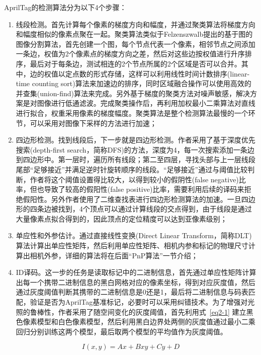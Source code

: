 AprilTag的检测算法分为以下4个步骤：

\begin{enumerate}[label=(\arabic*)] 
	\item 线段检测。首先计算每个像素的梯度方向和幅度，并通过聚类算法将梯度方向和幅度相似的像素点聚在一起。聚类算法类似于Felzenszwalb提出的基于图的图像分割算法，首先创建一个图，每个节点代表一个像素，相邻节点之间添加一条边，权值为2个像素点的梯度方向之差，然后对这些边按权值进行升序排序，最后对于每条边，测试相连的2个节点所属的2个区域是否可以合并。其中，边的权值以定点数的形式存储，这样可以利用线性时间计数排序(linear-time counting sort)算法来加速边的排序，同时区域融合操作可以使用高效的并查集(union-find)算法来完成。另外基于梯度的聚类方法对噪声敏感，解决方案是对图像进行低通滤波。完成聚类操作后，再利用加权最小二乘算法对直线进行拟合，权重采用像素的梯度幅度。聚类算法是整个检测算法最慢的一个环节，可以采用对图像下采样的方法进行加速；
	\item 四边形检测。找到线段后，下一步就是四边形检测。作者采用了基于深度优先搜索(depth-first search，简称DFS)的方法，深度为4，每一次搜索添加一条边到四边形中。第一层时，遍历所有线段；第二至四层，寻找头部与上一层线段尾部“足够接近”并满足逆时针旋转顺序的线段。“足够接近”通过与阈值比较判断，作者将这个阈值设置得比较大，以得到较小的假阴性(false negative)比率，但也导致了较高的假阳性(false positive)比率，需要利用后续的译码来拒绝假阳性。另外作者使用了二维查找表进行四边形检测算法的加速。一旦四边形的四条边被找到，4个顶点可以通过计算线段的交点得到，由于线段是通过大量像素点拟合得到的，因此顶点的定位精度可以达到亚像素级别；
	\item 单应性和外参估计。通过直接线性变换(Direct Linear Transform，简称DLT)算法计算出单应性矩阵，然后利用单应性矩阵、相机内参和标记的物理尺寸计算出相机外参，详细的算法将在后面“PnP算法”一节介绍；
	\item ID译码。这一步的任务是读取标记中的二进制信息，首先通过单应性矩阵计算出每一个携带二进制信息的黑白网格对应的像素坐标，得到对应灰度值，然后通过灰度阈值判断其携带的二进制信息是0还是1，最后将二进制信息与码表匹配，验证是否为AprilTag基准标记，必要时可以采用纠错技术。为了增强对光照的鲁棒性，作者采用了随空间变化的灰度阈值，首先利用式~\eqref{eq2-1} 建立黑色像素模型和白色像素模型，然后利用黑白边界处两侧的灰度值通过最小二乘回归分别训练这两个模型，最后取两个模型的平均值作为灰度阈值。
\end{enumerate}

\begin{equation}\label{eq2-1}
	I(x, y) = A x + B x y + C y + D
\end{equation}

